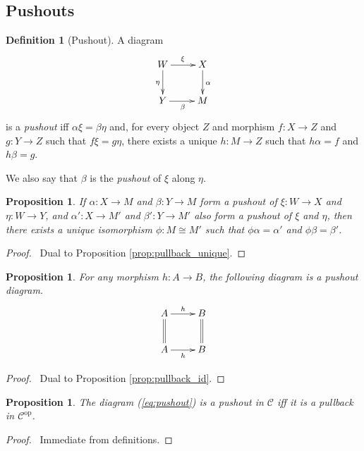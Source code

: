 \documentclass{book}
\let\qed\relax
\newtheorem{prop}[ax]{Proposition}
\theoremstyle{definition}
\newtheorem{df}[ax]{Definition}
\begin{document}
\subsection{Pushouts}

\begin{df}[Pushout]
A diagram
\begin{equation}
\label{eq:pushout}
\xymatrix{
W \ar[r]^\xi \ar[d]_\eta & X \ar[d]^\alpha \\
Y \ar[r]_\beta & M
}
\end{equation}
is a \emph{pushout} iff $\alpha \xi = \beta \eta$ and, for every object $Z$ and morphism $f : X \rightarrow Z$ and $g : Y \rightarrow Z$ such that $f \xi = g \eta$, there exists a unique $h : M \rightarrow Z$ such that $h \alpha = f$ and $h \beta = g$.

We also say that $\beta$ is the \emph{pushout} of $\xi$ along $\eta$.
\end{df}

\begin{prop}
If $\alpha : X \rightarrow M$ and $\beta : Y \rightarrow M$ form a pushout of $\xi : W \rightarrow X$ and $\eta : W \rightarrow Y$, and $\alpha' : X \rightarrow M'$ and $\beta' : Y \rightarrow M'$ also form a pushout of $\xi$ and $\eta$, then there exists a unique isomorphism $\phi : M \cong M'$ such that $\phi \alpha = \alpha'$ and $\phi \beta = \beta'$.
\end{prop}

\begin{proof}
\pf\ Dual to Proposition \ref{prop:pullback_unique}. \qed
\end{proof}

\begin{prop}
For any morphism $h : A \rightarrow B$, the following diagram is a pushout diagram.
\[ \xymatrix{
A \ar[r]^h \ar@{=}[d] & B \ar@{=}[d] \\
A \ar[r]_h & B
} \]
\end{prop}

\begin{proof}
\pf\ Dual to Proposition \ref{prop:pullback_id}.
\end{proof}

\begin{prop}
The diagram (\ref{eq:pushout}) is a pushout in $\mathcal{C}$ iff it is a pullback in $\mathcal{C}^\mathrm{op}$.
\end{prop}

\begin{proof}
\pf\ Immediate from definitions. \qed
\end{proof}
\end{document}
